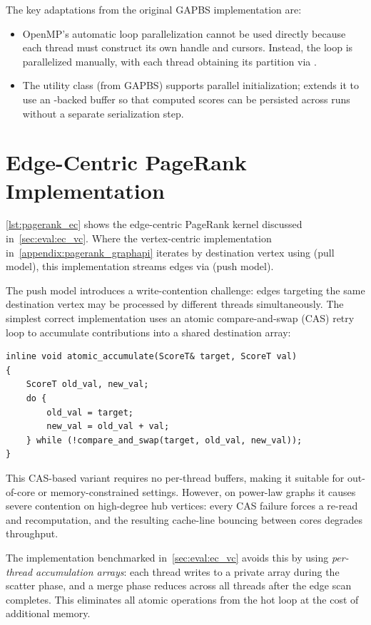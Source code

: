 The key adaptations from the original GAPBS implementation are:
\begin{itemize}
  \item OpenMP's automatic loop parallelization cannot be used directly because each thread must construct its own  handle and cursors. Instead, the loop is parallelized manually, with each thread obtaining its partition via .
  \item The  utility class (from GAPBS) supports parallel initialization; \project{} extends it to use an -backed buffer so that computed scores can be persisted across runs without a separate serialization step.
\end{itemize}

\section{Edge-Centric PageRank Implementation}
\label{appendix:pagerank_ec}

\autoref{lst:pagerank_ec} shows the edge-centric PageRank kernel discussed in~\autoref{sec:eval:ec_vc}.
Where the vertex-centric implementation in~\autoref{appendix:pagerank_graphapi} iterates by destination vertex using  (pull model), this implementation streams edges via  (push model).

The push model introduces a write-contention challenge: edges targeting the same destination vertex may be processed by different threads simultaneously.
The simplest correct implementation uses an atomic compare-and-swap (CAS) retry loop to accumulate contributions into a shared destination array:
\begin{lstlisting}[style=cpp, numbers=none]
inline void atomic_accumulate(ScoreT& target, ScoreT val)
{
    ScoreT old_val, new_val;
    do {
        old_val = target;
        new_val = old_val + val;
    } while (!compare_and_swap(target, old_val, new_val));
}
\end{lstlisting}
This CAS-based variant requires no per-thread buffers, making it suitable for out-of-core or memory-constrained settings.
However, on power-law graphs it causes severe contention on high-degree hub vertices: every CAS failure forces a re-read and recomputation, and the resulting cache-line bouncing between cores degrades throughput.

The implementation benchmarked in~\autoref{sec:eval:ec_vc} avoids this by using \emph{per-thread accumulation arrays}: each thread writes to a private  array during the scatter phase, and a merge phase reduces across all threads after the edge scan completes.
This eliminates all atomic operations from the hot loop at the cost of additional memory.


